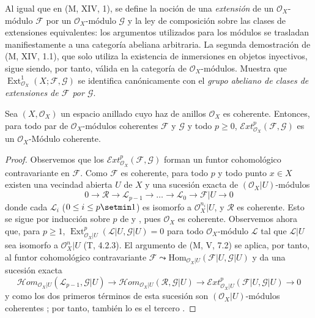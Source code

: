 \begin{env}[12.3.2]
\label{0.12.3.2}
\label{0.12.3.2-fr}
Al igual que en (M, XIV, 1), se define la noción de una
\emph{extensión} de un $\mathcal O_X$-módulo $\mathcal F$ por un
$\mathcal O_X$-módulo $\mathcal G$ y la ley de composición sobre las clases de
extensiones equivalentes: los argumentos utilizados para los módulos se
trasladan manifiestamente a una categoría abeliana arbitraria.
La segunda demostración de (M, XIV, 1.1), que solo utiliza la existencia de
inmersiones en objetos inyectivos, sigue siendo, por tanto, válida en la
categoría de $\mathcal O_X$-módulos.  Muestra que
$\operatorname{Ext}_{\mathcal O_X}^1(X;\mathcal F,\mathcal G)$
se identifica canónicamente con el \emph{grupo abeliano de clases de
extensiones de $\mathcal F$ por $\mathcal G$}.
\end{env}

\begin{proposition}[12.3.3]
\label{0.12.3.3}
\label{0.12.3.3-fr}
Sea $(X,\mathcal O_X)$ un espacio anillado cuyo haz de anillos
$\mathcal O_X$ es coherente.
Entonces, para todo par de $\mathcal O_X$-módulos coherentes $\mathcal F$ y
$\mathcal G$ y todo $p\geq0$,
$\mathcal{E}xt_{\mathcal O_X}^p(\mathcal F,\mathcal G)$
es un $\mathcal O_X$-Módulo coherente.
\end{proposition}

\begin{proof}
Observemos que los $\mathcal{E}xt_{\mathcal O_X}^p(\mathcal F,\mathcal G)$ forman un funtor cohomológico
contravariante en $\mathcal F$.
Como $\mathcal F$ es coherente, para todo $p$ y todo punto $x\in X$
existen una vecindad abierta $U$ de $X$ y una sucesión exacta
de $(\mathcal O_X|U)$-módulos
\[
0\longrightarrow\mathcal R\longrightarrow\mathcal L_{p-1}
\longrightarrow\ldots\longrightarrow\mathcal L_0
\longrightarrow\mathcal F|U\longrightarrow0
\]
donde cada $\mathcal L_i$ ($0\leq i\leq p\setmin 1$) es isomorfo a
$\mathcal O_X^{n_i}|U$, y $\mathcal R$ es coherente.
Esto se sigue por inducción sobre $p$ de
 y
, pues $\mathcal O_X$ es coherente. Observemos ahora que, para $p\geq1$,
$\operatorname{Ext}_{\mathcal O_X|U}^p(\mathcal L|U,\mathcal G|U)=0$
para todo $\mathcal O_X$-módulo $\mathcal L$ tal que $\mathcal L|U$ sea
isomorfo a $\mathcal O_X^n|U$ (T, 4.2.3).
El argumento de (M, V, 7.2) se aplica, por tanto, al funtor cohomológico
contravariante
$\mathcal F\leadsto
\mathrm{Hom}_{\mathcal O_X|U}(\mathcal F|U,\mathcal G|U)$
y da una sucesión exacta
\[
\mathcal{H}om_{\mathcal O_X|U}(\mathcal L_{p-1},\mathcal G|U)
\longrightarrow
\mathcal{H}om_{\mathcal O_X|U}(\mathcal R,\mathcal G|U)
\longrightarrow
\mathcal{E}xt_{\mathcal O_X|U}^p(\mathcal F|U,\mathcal G|U)
\longrightarrow0
\] y como los dos primeros términos de esta sucesión son $(\mathcal O_X|U)$-módulos coherentes
; por tanto, también lo es el tercero
.
\end{proof}

